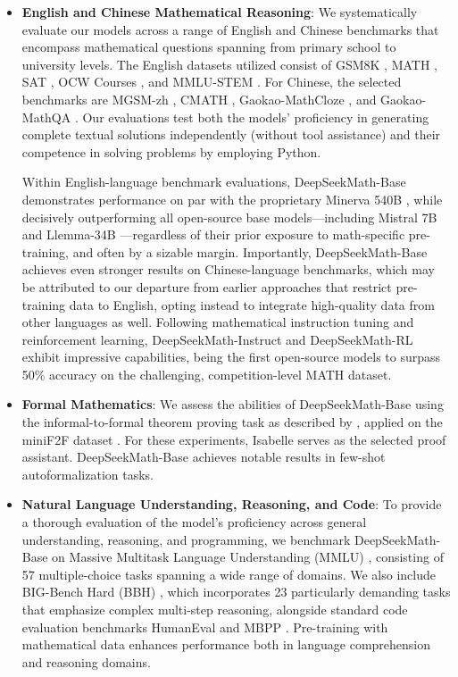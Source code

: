 \begin{itemize}[topsep=0pt]
    \item \textbf{English and Chinese Mathematical Reasoning}: We systematically evaluate our models across a range of English and Chinese benchmarks that encompass mathematical questions spanning from primary school to university levels. The English datasets utilized consist of GSM8K \citep{gsm8k}, MATH \citep{MATH}, SAT \citep{llemma}, OCW Courses \citep{minerva}, and MMLU-STEM \citep{mmlu}. For Chinese, the selected benchmarks are MGSM-zh \citep{mgsm}, CMATH \citep{wei2023cmath}, Gaokao-MathCloze \citep{agieval}, and Gaokao-MathQA \citep{agieval}. Our evaluations test both the models' proficiency in generating complete textual solutions independently (without tool assistance) and their competence in solving problems by employing Python.

Within English-language benchmark evaluations, DeepSeekMath-Base demonstrates performance on par with the proprietary Minerva 540B \citep{minerva}, while decisively outperforming all open-source base models—including Mistral 7B \citep{mistral} and Llemma-34B \citep{llemma}—regardless of their prior exposure to math-specific pre-training, and often by a sizable margin. Importantly, DeepSeekMath-Base achieves even stronger results on Chinese-language benchmarks, which may be attributed to our departure from earlier approaches \citep{minerva,llemma} that restrict pre-training data to English, opting instead to integrate high-quality data from other languages as well. Following mathematical instruction tuning and reinforcement learning, DeepSeekMath-Instruct and DeepSeekMath-RL exhibit impressive capabilities, being the first open-source models to surpass 50\% accuracy on the challenging, competition-level MATH dataset.

\item \textbf{Formal Mathematics}: We assess the abilities of DeepSeekMath-Base using the informal-to-formal theorem proving task as described by \citep{dsp_proof}, applied on the miniF2F dataset \citep{minif2f}. For these experiments, Isabelle \citep{isabelle} serves as the selected proof assistant. DeepSeekMath-Base achieves notable results in few-shot autoformalization tasks.
\item \textbf{Natural Language Understanding, Reasoning, and Code}: To provide a thorough evaluation of the model's proficiency across general understanding, reasoning, and programming, we benchmark DeepSeekMath-Base on Massive Multitask Language Understanding (MMLU) \citep{mmlu}, consisting of 57 multiple-choice tasks spanning a wide range of domains. We also include BIG-Bench Hard (BBH) \citep{bbh}, which incorporates 23 particularly demanding tasks that emphasize complex multi-step reasoning, alongside standard code evaluation benchmarks HumanEval \citep{codex} and MBPP \citep{mbpp}. Pre-training with mathematical data enhances performance both in language comprehension and reasoning domains.


\end{itemize}
